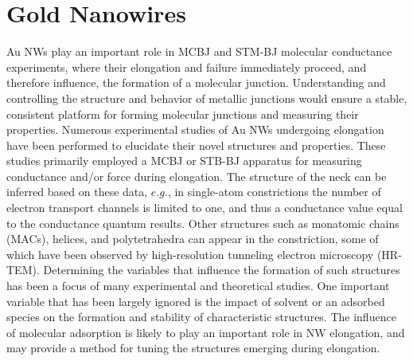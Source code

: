 \documentclass[10pt]{report}  %
\newcommand\findent{\hspace*{\parindent}}
\begin{document}
\section{Gold Nanowires} 

\findent Au NWs play an important role in MCBJ and STM-BJ molecular conductance experiments, where their elongation and failure immediately proceed, and therefore influence, the formation of a molecular junction. Understanding and controlling the structure and behavior of metallic junctions would ensure a stable, consistent platform for forming molecular junctions and measuring their properties. Numerous experimental studies \cite{Rubio:1996,Scheer:1998,Yanson:1998,Marszalek:2000,Tsutsui_nl:2008} of Au NWs undergoing elongation have been performed to elucidate their novel structures and properties. These studies primarily employed a MCBJ or STB-BJ apparatus for measuring conductance and/or force during elongation. The structure of the neck can be inferred based on these data, $e.g.$, in single-atom constrictions the number of electron transport channels is limited to one, and thus a conductance value equal to the conductance quantum results.\cite{Scheer:1998,Yanson:1998} Other structures such as monatomic chains (MACs),\cite{Coura:2004,Rodrigues:2001,Rodrigues:2000} helices,\cite{Coura:2004,Oshima:2003,Kondo:2000,Rodrigues:2000} and polytetrahedra\cite{Iacovella:2011} can appear in the constriction, some of which have been observed by high-resolution tunneling electron microscopy (HR-TEM).\cite{Coura:2004,Oshima:2003,Kondo:2000,Rodrigues:2000}  Determining the variables that influence the formation of such structures has been a focus of many experimental and theoretical studies.\cite{Rodrigues:2000,Pu:2008,Iacovella:2011} One important variable that has been largely ignored is the impact of solvent or an adsorbed species on the formation and stability of characteristic structures. The influence of molecular adsorption is likely to play an important role in NW elongation, and may provide a method for tuning the structures emerging during elongation. 
\end{document}
